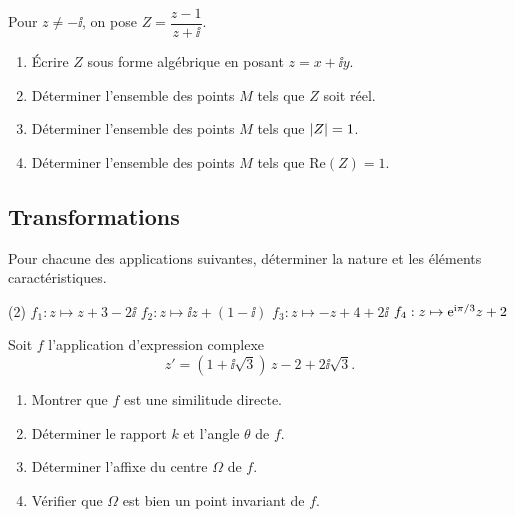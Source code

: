 Pour $z \neq -\ii$, on pose $Z = \dfrac{z - 1}{z + \ii}$.
\begin{enumerate}
	\item Écrire $Z$ sous forme algébrique en posant $z = x + \ii y$.
	\item Déterminer l'ensemble des points $M$ tels que $Z$ soit réel.
	\item Déterminer l'ensemble des points $M$ tels que $\left|Z\right| = 1$.
	\item Déterminer l'ensemble des points $M$ tels que $\mathrm{Re}(Z) = 1$.
\end{enumerate}

\subsection{Transformations}



Pour chacune des applications suivantes, déterminer la nature et les éléments
caractéristiques.

\begin{listecol}(2)
	\task $f_1 : z \mapsto z + 3 - 2\ii$
	\task $f_2 : z \mapsto \ii z + (1 - \ii)$
	\task $f_3 : z \mapsto -z + 4 + 2\ii$
	\task $f_4 : z \mapsto \mathrm{e}^{\mathrm{i}\pi/3} z + 2$
\end{listecol}



Soit $f$ l'application d'expression complexe
$$
z' = (1 + \ii\sqrt{3})\,z - 2 + 2\ii\sqrt{3}.
$$

\begin{enumerate}
	\item Montrer que $f$ est une similitude directe.
	\item Déterminer le rapport $k$ et l'angle $\theta$ de $f$.
	\item Déterminer l'affixe du centre $\Omega$ de $f$.
	\item Vérifier que $\Omega$ est bien un point invariant  de $f$.
\end{enumerate}


